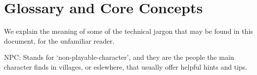 \section{Glossary and Core Concepts}

We explain the meaning of some of the technical jargon that may be found in this
document, for the unfamiliar reader.

\begin{description}

\item {NPC}: Stands for `non-playable-character', and they are the people the
  main character finds in villages, or eslewhere, that usually offer helpful
  hints and tips.

\end{description}

